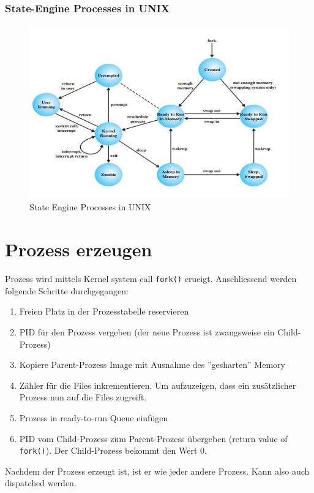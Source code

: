 \subsubsection{State-Engine Processes in UNIX}
\begin{figure}[h!]
\centering
\includegraphics[width=0.9\linewidth]{fig/system-software-state-engine-processes-unix}
\caption{State Engine Processes in UNIX}
\label{fig:system-software-state-engine-processes-unix}
\end{figure}


\section{Prozess erzeugen}
Prozess wird mittels Kernel system call \texttt{fork()} erueigt. Anschliessend werden folgende Schritte durchgegangen:
\begin{enumerate}
	\item Freien Platz in der Prozesstabelle reservieren
	\item PID für den Prozess vergeben (der neue Prozess ist zwangsweise ein Child-Prozess)
	\item Kopiere Parent-Prozess Image mit Ausnahme des ''gesharten'' Memory
	\item Zähler für die Files inkrementieren. Um aufzuzeigen, dass ein zusätzlicher Prozess nun auf die Files zugreift.
	\item Prozess in ready-to-run Queue einfügen
	\item PID vom Child-Prozess zum Parent-Prozess übergeben (return value of \texttt{fork()}). Der Child-Prozess bekommt den Wert 0.
\end{enumerate}

Nachdem der Prozess erzeugt ist, ist er wie jeder andere Prozess. Kann also auch dispatched werden.

